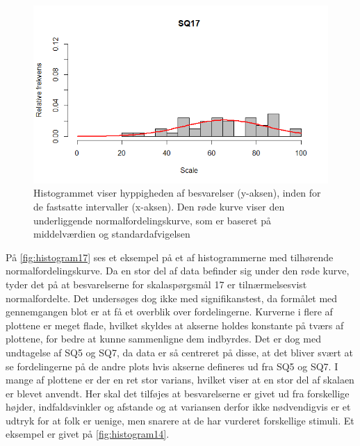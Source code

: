 \begin{figure}[H]
\centering
\includegraphics[width = \textwidth]{Figure/DatabehandlingSkalaer/HistogramNormalFordeling/SQ17} 
\caption{Histogrammet viser hyppigheden af besvarelser (y-aksen), inden for de fastsatte intervaller (x-aksen). Den røde kurve viser den underliggende normalfordelingskurve, som er baseret på middelværdien og standardafvigelsen}
\label{fig:histogram17}
\end{figure}
\noindent
%
På \autoref{fig:histogram17} ses et eksempel på et af histogrammerne med tilhørende normalfordelingskurve. Da en stor del af data befinder sig under den røde kurve, tyder det på at besvarelserne for skalaspørgsmål 17 er tilnærmelsesvist normalfordelte. Det undersøges dog ikke med signifikanstest, da formålet med gennemgangen blot er at få et overblik over fordelingerne.\blankline
%
Kurverne i flere af plottene er meget flade, hvilket skyldes at akserne holdes konstante på tværs af plottene, for bedre at kunne sammenligne dem indbyrdes. Det er dog med undtagelse af SQ5 og SQ7, da data er så centreret på disse, at det bliver svært at se fordelingerne på de andre plots hvis akserne defineres ud fra SQ5 og SQ7.\blankline
%
I mange af plottene er der en ret stor varians, hvilket viser at en stor del af skalaen er blevet anvendt. Her skal det tilføjes at besvarelserne er givet ud fra forskellige højder, indfaldsvinkler og afstande og at variansen derfor ikke nødvendigvis er et udtryk for at folk er uenige, men snarere at de har vurderet forskellige stimuli. Et eksempel er givet på \autoref{fig:histogram14}.\blankline
%
